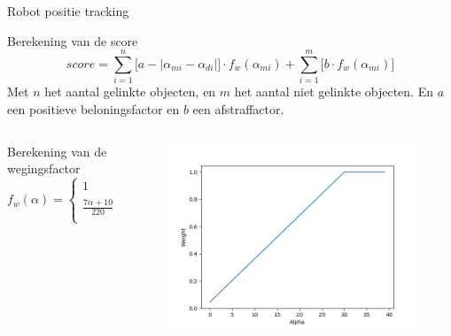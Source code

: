 \documentclass[11pt,t]{beamer}
\begin{document}
\begin{frame}[fragile]{Robot positie tracking}
	\begin{block}{Berekening van de score}
		\[
			score = \sum_{i=1}^{n}\big[a - |\alpha_{mi} - \alpha_{di}|\big] \cdot f_w(\alpha_{mi}) + \sum_{i=1}^{m}\big[b \cdot f_w(\alpha_{mi})\big]
		\]
		\centering
		Met $n$ het aantal gelinkte objecten, en $m$ het aantal niet gelinkte objecten. En $a$ een positieve beloningsfactor en $b$ een afstraffactor.
	\end{block}
	\begin{columns}[t]
		\begin{column}{.7\textwidth}
		\begin{block}{Berekening van de wegingsfactor}
			\[
				f_w(\alpha) = \left\{\begin{array}{lr}
					1 & \text{for } 30 < |\alpha|\\
					\frac{7\alpha + 10}{220} & \text{for } 0 \leq |\alpha| \leq 30\\
				\end{array}
				\right\}
			\]
		\end{block}
		\end{column}
		\begin{column}{.3\textwidth}
			\begin{figure}
				\centering
				\includegraphics[width=\textwidth]{graphics/wegingsfactor.png}
			\end{figure}
		\end{column}
	\end{columns}
\end{frame}
\end{document}
